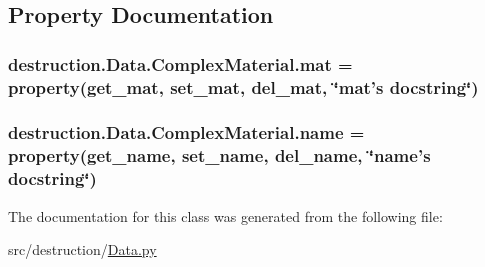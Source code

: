 \subsection{Property Documentation}
\hypertarget{classdestruction_1_1_data_1_1_complex_material_a253d882465e0dcf869876123bbbd91e7}{
\subsubsection[{mat}]{\setlength{\rightskip}{0pt plus 5cm}destruction.\-Data.\-Complex\-Material.\-mat = property({\bf get\-\_\-mat}, {\bf set\-\_\-mat}, {\bf del\-\_\-mat}, \char`\"{}mat's docstring\char`\"{})\hspace{0.3cm}{\ttfamily [static]}}}\label{classdestruction_1_1_data_1_1_complex_material_a253d882465e0dcf869876123bbbd91e7}
\hypertarget{classdestruction_1_1_data_1_1_complex_material_adb022aee91ece74be1d0e0d01a84f082}{
\subsubsection[{name}]{\setlength{\rightskip}{0pt plus 5cm}destruction.\-Data.\-Complex\-Material.\-name = property({\bf get\-\_\-name}, {\bf set\-\_\-name}, {\bf del\-\_\-name}, \char`\"{}name's docstring\char`\"{})\hspace{0.3cm}{\ttfamily [static]}}}\label{classdestruction_1_1_data_1_1_complex_material_adb022aee91ece74be1d0e0d01a84f082}


The documentation for this class was generated from the following file\-:\begin{DoxyCompactItemize}
\item 
src/destruction/\hyperlink{_data_8py}{Data.\-py}\end{DoxyCompactItemize}
